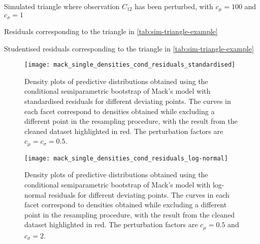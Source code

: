\documentclass[a4paper]{book}
\begin{document}
\enlargethispage{10\baselineskip}

\begin{table}[!htb]
  
  \caption{Simulated triangle where observation $C_{12}$ has been perturbed, with $c_\mu = 100$ and $c_\sigma = 1$}
  \label{tab:sim-triangle-example}
\end{table}

\begin{table}[!htb]
  \setlength\tabcolsep{3pt}
  \begin{subtable}{0.45\linewidth}
    \centering
    
    \label{tab:resids-standard-example}
  \end{subtable}
  \hfill
  \begin{subtable}{0.45\linewidth}
    \centering
    
    \label{tab:resids-log-normal-example}
  \end{subtable}
  \caption{Residuals corresponding to the triangle in \cref{tab:sim-triangle-example}}
\end{table}

\begin{table}[!htb]
  
  \caption{Studentised residuals corresponding to the triangle in \cref{tab:sim-triangle-example}}
  \label{tab:resids-studentised-example}
\end{table}


\begin{landscape}
  \begin{figure}
    \centering
    \texttt{[image: mack\_single\_densities\_cond\_residuals\_standardised]}
    \caption{Density plots of predictive distributions obtained using the conditional semiparametric bootstrap of Mack's model with standardised residuals for different deviating points. The curves in each facet correspond to densities obtained while excluding a different point in the resampling procedure, with the result from the cleaned dataset highlighted in red. The perturbation factors are $c_\mu = c_\sigma = 0.5$.}
    \label{fig:mack-single-cond-semiparam-standardised}
  \end{figure}
\end{landscape}

\begin{landscape}
  \begin{figure}
    \centering
    \texttt{[image: mack\_single\_densities\_cond\_residuals\_log-normal]}
    \caption{Density plots of predictive distributions obtained using the conditional semiparametric bootstrap of Mack's model with log-normal residuals for different deviating points. The curves in each facet correspond to densities obtained while excluding a different point in the resampling procedure, with the result from the cleaned dataset highlighted in red. The perturbation factors are $c_\mu = 0.5$ and $c_\sigma = 2$.}
    \label{fig:mack-single-cond-semiparam-log-normal}
  \end{figure}
\end{landscape}
\end{document}
